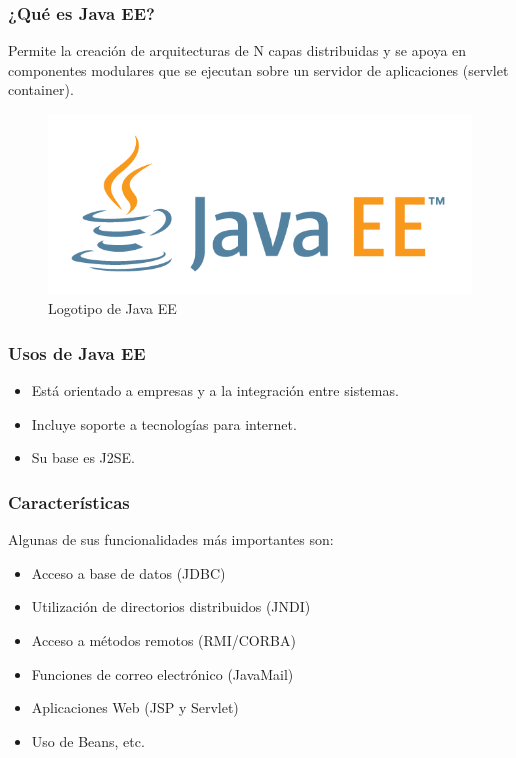 \documentclass{beamer}
\begin{document}
\begin{frame}
  \frametitle{¿Qué es Java EE?}
  Permite la creación de arquitecturas de N capas distribuidas y se
  apoya en componentes modulares que se ejecutan sobre un servidor de
  aplicaciones (servlet container).

  \begin{figure}[ht]
    \centering
    \includegraphics[scale=0.25]{figures/javaee1.png}
    \caption{\label{fig:javaee1}Logotipo de Java EE}
  \end{figure}
\end{frame}

\begin{frame}
  \frametitle{Usos de Java EE}

  \begin{itemize}
    \item Está orientado a empresas y a la integración entre sistemas.
    \item Incluye soporte a tecnologías para internet.
    \item Su base es J2SE.
  \end{itemize}
\end{frame}

\begin{frame}
  \frametitle{Características}
    Algunas de sus funcionalidades más importantes son:
  \begin{itemize}
    \item Acceso a base de datos (JDBC)
    \item Utilización de directorios distribuidos (JNDI)
    \item Acceso a métodos remotos (RMI/CORBA)
    \item Funciones de correo electrónico (JavaMail)
    \item Aplicaciones Web (JSP y Servlet)
    \item Uso de Beans, etc.
  \end{itemize}
\end{frame}
\end{document}
